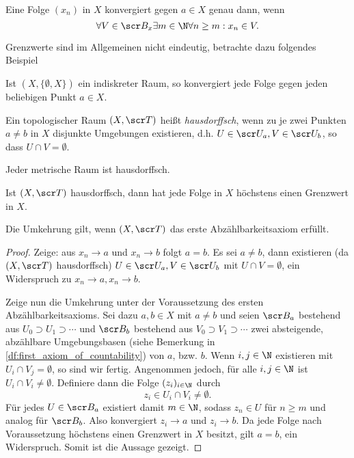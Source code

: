 \begin{prop}
	Eine Folge $(x_n)$ in $X$ konvergiert gegen $a \in X$ genau dann, wenn
	\[
		\forall V \in \scr B_x \exists m \in \N \forall n \ge m : x_n \in V.
	\]
\end{prop}

Grenzwerte sind im Allgemeinen nicht eindeutig, betrachte dazu folgendes Beispiel

\begin{ex}
	Ist $(X, \{\emptyset, X\})$ ein indiskreter Raum, so konvergiert jede Folge gegen jeden beliebigen Punkt $a \in X$.
\end{ex}

\begin{df}
	Ein topologischer Raum $(X, \scr T)$ heißt \emph{hausdorffsch}, wenn zu je zwei Punkten $a \neq b$ in $X$ disjunkte Umgebungen existieren, d.h. $U \in \scr U_a, V \in \scr U_b$, so dass $U \cap V = \emptyset$.
\end{df}

\begin{ex}
	Jeder metrische Raum ist hausdorffsch.
\end{ex}

\begin{st}
	Ist $(X,\scr T)$ hausdorffsch, dann hat jede Folge in $X$ höchstens einen Grenzwert in $X$.

	Die Umkehrung gilt, wenn $(X, \scr T)$ das erste Abzählbarkeitsaxiom erfüllt.
	\begin{proof}
		Zeige: aus $x_n \to a$ und $x_n \to b$ folgt $a = b$.
		Es sei $a \neq b$, dann existieren (da $(X, \scr T)$ hausdorffsch) $U \in \scr U_a, V \in \scr U_b$ mit $U \cap V = \emptyset$, ein Widerspruch zu $x_n \to a, x_n \to b$.

		Zeige nun die Umkehrung unter der Voraussetzung des ersten Abzählbarkeitsaxioms.
		Sei dazu $a, b \in X$ mit $a \neq b$ und seien $\scr B_a$ bestehend aus $U_0 \supset U_1 \supset \dotsb$ und $\scr B_b$ bestehend aus $V_0 \supset V_1 \supset \dotsb$ zwei absteigende, abzählbare Umgebungsbasen (siehe Bemerkung in \ref{df:first_axiom_of_countability}) von $a$, bzw. $b$.
		Wenn $i,j \in \N$ existieren mit $U_i \cap V_j = \emptyset$, so sind wir fertig.
		Angenommen jedoch, für alle $i,j \in \N$ ist $U_i \cap V_i \neq \emptyset$.
		Definiere dann die Folge $(z_i)_{i\in\N}$ durch
		\[
			z_i \in U_i \cap V_i \neq \emptyset.
		\]
		Für jedes $U \in \scr B_a$ existiert damit $m \in \N$, sodass $z_n \in U$ für $n \ge m$ und analog für $\scr B_b$.
		Also konvergiert $z_i \to a$ und $z_i \to b$.
		Da jede Folge nach Voraussetzung höchstens einen Grenzwert in $X$ besitzt, gilt $a = b$, ein Widerspruch.
		Somit ist die Aussage gezeigt.
	\end{proof}
\end{st}

